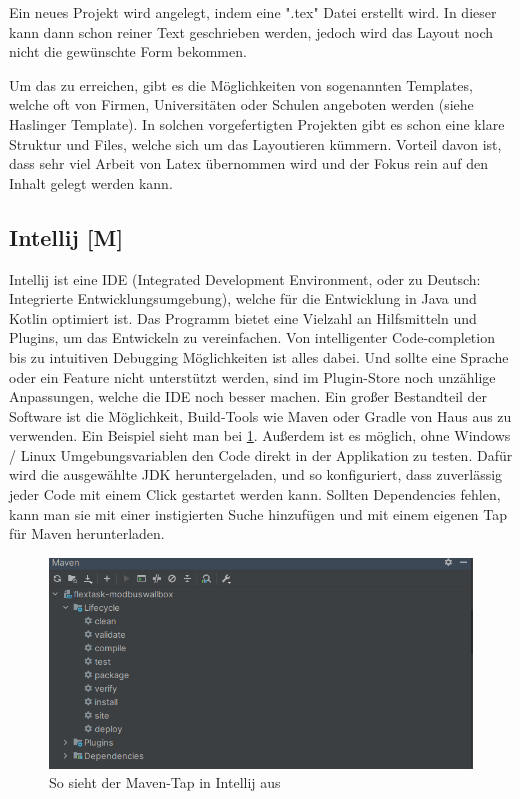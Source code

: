   

Ein neues Projekt wird angelegt, indem eine ".tex" Datei erstellt wird. In dieser kann dann schon reiner Text geschrieben werden, jedoch wird das Layout noch nicht die gewünschte Form bekommen.    

Um das zu erreichen, gibt es die Möglichkeiten von sogenannten Templates, welche oft von Firmen, Universitäten oder Schulen angeboten werden (siehe Haslinger Template). In solchen vorgefertigten Projekten gibt es schon eine klare Struktur und Files, welche sich um das Layoutieren kümmern. Vorteil davon ist, dass sehr viel Arbeit von Latex übernommen wird und der Fokus rein auf den Inhalt gelegt werden kann. 


\subsection{Intellij [M]} 

Intellij ist eine IDE (Integrated Development Environment, oder zu Deutsch: Integrierte Entwicklungsumgebung), welche für die Entwicklung in Java und Kotlin optimiert ist. Das Programm bietet eine Vielzahl an Hilfsmitteln und Plugins, um das Entwickeln zu vereinfachen. Von intelligenter Code-completion bis zu intuitiven Debugging Möglichkeiten ist alles dabei.  Und sollte eine Sprache oder ein Feature nicht unterstützt werden, sind im Plugin-Store noch unzählige Anpassungen, welche die IDE noch besser machen. Ein großer Bestandteil der Software ist die Möglichkeit, Build-Tools wie Maven oder Gradle von Haus aus zu verwenden. Ein Beispiel sieht man bei \ref{fig:impl:WallboxMavenTap}. Außerdem ist es möglich, ohne Windows / Linux Umgebungsvariablen den Code direkt in der Applikation zu testen. Dafür wird die ausgewählte JDK heruntergeladen, und so konfiguriert, dass zuverlässig jeder Code mit einem Click gestartet werden kann. Sollten Dependencies fehlen, kann man sie mit einer instigierten Suche hinzufügen und mit einem eigenen Tap für Maven herunterladen. 

\begin{figure}[h t]
    \centering
    \includegraphics[scale=0.5]{pics/MavenOverfiew.png}
    \caption{So sieht der Maven-Tap in Intellij aus}
    \label{fig:impl:WallboxMavenTap}
  \end{figure}

